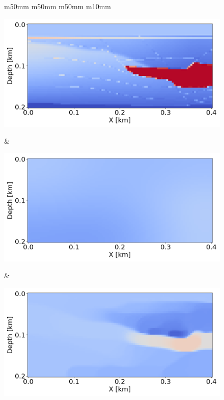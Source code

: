 \begin{figure}[htbp]
    \centering
    \begin{tabular}{m{50mm} m{50mm} m{50mm} m{10mm}}
        \begin{minipage}[b]{\linewidth}
            \centering
            \includegraphics[width=\linewidth]{public/true}
            \vspace{-9mm}
            \caption*{}
            \vspace{1mm}
        \end{minipage} &
        \begin{minipage}[b]{\linewidth}
            \centering
            \includegraphics[width=\linewidth]{public/initial}
            \vspace{-9mm}
            \caption*{}
            \vspace{1mm}
        \end{minipage} &
        \begin{minipage}[b]{\linewidth}
            \centering
            \includegraphics[width=\linewidth]{public/alpha_150}

\end{minipage}
\end{tabular}
\end{figure}
